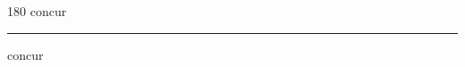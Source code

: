
\begin{frame}
\begin{center}
\begin{turn}{180}
{\fontsize{2.5cm}{1em}\selectfont concur}
\end{turn}
\vspace{1em}\par  
\hrule
\vspace{1em}\par  
{\fontsize{2.5cm}{1em}\selectfont concur}
\end{center}
\end{frame}
